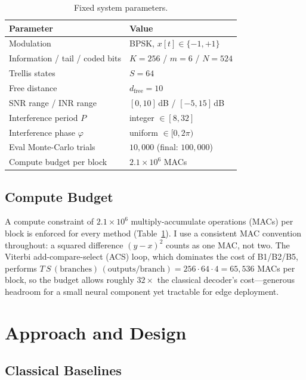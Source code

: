 \documentclass[conference]{IEEEtran}
\newcommand{\dfree}{d_{\mathrm{free}}}
\begin{document}
\begin{table}[t]
  \centering
  \caption{Fixed system parameters.}
  \label{tab:params}
  \small
  \begin{tabular}{ll}
    \toprule
    Parameter & Value \\
    \midrule
    Modulation & BPSK, $x[t] \in \{-1,+1\}$ \\
    Information / tail / coded bits & $K{=}256$ / $m{=}6$ / $N{=}524$ \\
    Trellis states & $S = 64$ \\
    Free distance & $\dfree = 10$ \\
    SNR range / INR range & $[0,10]$\,dB / $[-5,15]$\,dB \\
    Interference period $P$ & integer $\in [8, 32]$ \\
    Interference phase $\varphi$ & uniform $\in [0, 2\pi)$ \\
    Eval Monte-Carlo trials & $10{,}000$ (final: $100{,}000$) \\
    Compute budget per block & $2.1\times10^6$ MACs \\
    \bottomrule
  \end{tabular}
\end{table}

\subsection{Compute Budget}
\label{sec:budget}
A compute constraint of $2.1\times10^{6}$ multiply-accumulate operations
(MACs) per block is enforced for every method (Table~\ref{tab:params}).
I use a consistent MAC convention throughout: a squared difference
$(y-x)^2$ counts as one MAC, not two.  The Viterbi add-compare-select
(ACS) loop, which dominates the cost of B1/B2/B5, performs
$T\,S\,(\text{branches})\,(\text{outputs/branch}) = 256{\cdot}64{\cdot}4
= 65{,}536$ MACs per block, so the budget allows roughly $32\times$ the
classical decoder's cost---generous headroom for a small neural
component yet tractable for edge deployment.

\section{Approach and Design}

\subsection{Classical Baselines}
\end{document}
